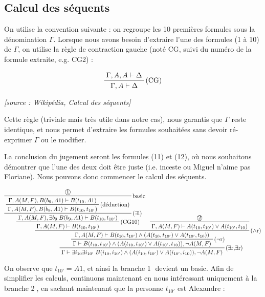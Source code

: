 \documentclass[10pt]{extarticle}
\begin{document}
\newpage
\begin{landscape}
\subsection*{Calcul des séquents}
On utilise la convention suivante : on regroupe les 10 premières formules sous la dénomination $\Gamma$. Lorsque nous avons besoin d'extraire l'une des formules (1 à 10) de $\Gamma$, on utilise la règle de contraction gauche (noté CG, suivi du numéro de la formule extraite, e.g. CG2) :

\begin{displaymath}
\prftree[r]{(CG)}{\Gamma , A , A \vdash \Delta}{\Gamma, A \vdash \Delta}
\end{displaymath}

\begin{center}
\emph{[source : Wikipédia, Calcul des séquents]}
\end{center}

Cette règle (triviale mais très utile dans notre cas), nous garantis que $\Gamma$ reste identique, et nous permet d'extraire les formules souhaitées sans devoir ré-exprimer $\Gamma$ ou le modifier.

La conclusion du jugement seront les formules (11) et (12), où nous souhaitons démontrer que l'une des deux doit être juste (i.e. inceste ou Miguel n'aime pas Floriane). Nous pouvons donc commencer le calcul des séquents.

\begin{displaymath}
\prftree[r]
{($\exists$r,$\exists$r)}
{\prftree[r]{($\neg$r)}
{\prftree[r]{($\land$r)}
{\prftree[r]{(CG10)}
{\prftree[r]{($\exists$l)}
{\prftree[r]{basic}
{\text{\textcircled{1}}}
{\prftree[r]{(déduction)}
{\Gamma , A(M,F) , B(b_9,A1) \vdash B(t_{10},A1)}
{\Gamma , A(M,F) , B(b_9,A1) \vdash B(t_{10},t_{10'})}}}
{\Gamma , A(M,F) , \exists b_9 \; B(b_9,A1) \vdash B(t_{10},t_{10'})}}
{\Gamma , A(M,F) \vdash B(t_{10},t_{10'})}}
{\prftree[r]{}
{\text{\textcircled{2}}}
{\Gamma , A(M,F) \vdash A(t_{10},t_{10'}) \lor A(t_{10'},t_{10})}}
{\Gamma , A(M,F) \vdash B(t_{10},t_{10'}) \land (A(t_{10},t_{10'}) \lor A(t_{10'},t_{10}))}}
{\Gamma \vdash B(t_{10},t_{10'}) \land (A(t_{10},t_{10'}) \lor A(t_{10'},t_{10})), \neg A(M,F)}}
{\Gamma \vdash \exists i_{10} \exists i_{10'} \; B(i_{10},i_{10'}) \land (A(i_{10},i_{10'}) \lor A(i_{10'},i_{10})), \neg A(M,F)}
\end{displaymath}

On observe que $t_{10'} = A1$, et ainsi la branche \textcircled{1} devient un basic. Afin de simplifier les calculs, continuons maintenant en nous intéressant uniquement à la branche \textcircled{2}, en sachant maintenant que la personne $t_{10'}$ est Alexandre :


\end{landscape}
\end{document}
